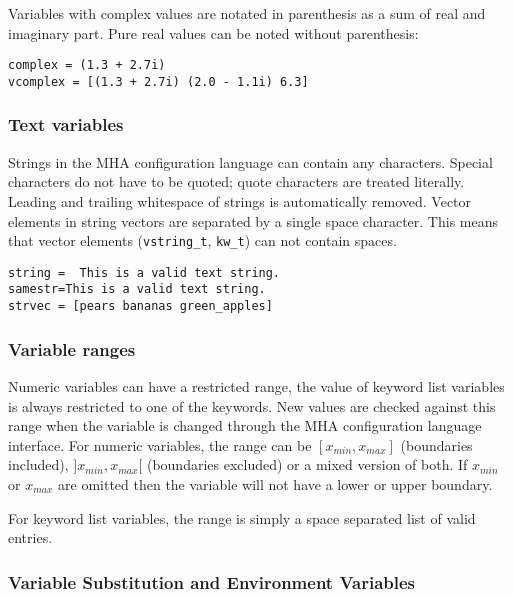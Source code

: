 Variables with complex values are notated in parenthesis as a sum of
real and imaginary part. Pure real values can be noted without
parenthesis:

\begin{verbatim}
complex = (1.3 + 2.7i)
vcomplex = [(1.3 + 2.7i) (2.0 - 1.1i) 6.3]
\end{verbatim}

\subsubsection{Text variables}

Strings in the MHA configuration language can contain any characters. Special
characters do not have to be quoted; quote characters are treated
literally. Leading and trailing whitespace of strings is automatically
removed. Vector elements in string vectors are separated by a single
space character. This means that vector elements
(\verb!vstring_t!, \verb!kw_t!) can not contain spaces.

\begin{verbatim}
string =  This is a valid text string.
samestr=This is a valid text string.
strvec = [pears bananas green_apples]
\end{verbatim}

\subsubsection{Variable ranges}

Numeric variables can have a restricted range, the value of keyword list 
variables is always restricted to one of the keywords. New values are checked 
against this range when the variable is changed through the MHA configuration 
language interface. For numeric variables, the range can be 
$[x_{min},x_{max}]$ (boundaries included), $]x_{min},x_{max}[$
(boundaries excluded) or a mixed version of both. If $x_{min}$ or
$x_{max}$ are omitted then the variable will not have a lower or
upper boundary.

For keyword list variables, the range is simply a space separated list of valid
entries.

\subsubsection{Variable Substitution and Environment
  Variables}

